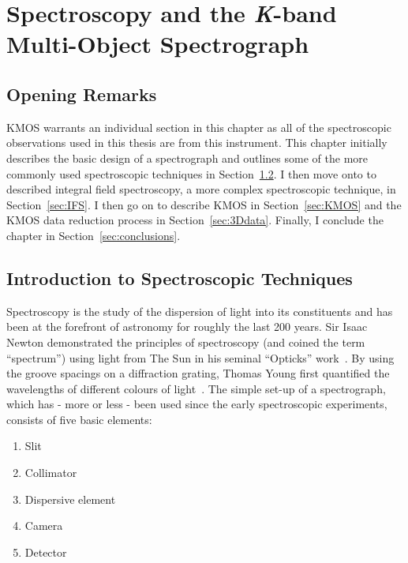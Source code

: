 \chapter{Spectroscopy and the {\it K}-band Multi-Object Spectrograph}

\section{Opening Remarks} %
\label{sec:opening_remarks}
KMOS warrants an individual section in this chapter as all of the spectroscopic observations used in this thesis are from this instrument.
This chapter initially describes the basic design of a spectrograph and outlines some of the more commonly used spectroscopic techniques in Section~\ref{sec:intro_to_spec}.
I then move onto to described integral field spectroscopy, a more complex spectroscopic technique, in Section~\ref{sec:IFS}.
I then go on to describe KMOS in Section~\ref{sec:KMOS} and the KMOS data reduction process in Section~\ref{sec:3Ddata}.
Finally, I conclude the chapter in Section~\ref{sec:conclusions}.



\section{Introduction to Spectroscopic Techniques} %
\label{sec:intro_to_spec}

Spectroscopy is the study of the dispersion of light into its constituents and has been at the forefront of astronomy for roughly the last 200 years.
Sir Isaac Newton demonstrated the principles of spectroscopy (and coined the term ``spectrum'') using light from The Sun in his seminal ``Opticks'' work~\citep{b:Newton}.
By using the groove spacings on a diffraction grating, Thomas Young first quantified the wavelengths of different colours of light~\citep{1802PTRSL.92.12Y}.
The simple set-up of a spectrograph, which has - more or less - been used since the early spectroscopic experiments, consists of five basic elements:


\begin{enumerate}
    \item Slit
    \item Collimator
    \item Dispersive element
    \item Camera
    \item Detector
\end{enumerate}

